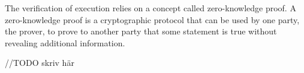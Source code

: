 
The verification of execution relies on a concept called
zero-knowledge proof. A zero-knowledge proof is a cryptographic
protocol that can be used by one party, the prover, to prove to
another party that some statement is true without revealing additional
information.

//TODO skriv här

\vspace{36pt}

\begin{center}
\end{center}

